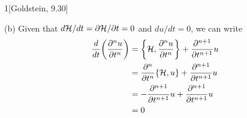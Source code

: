 \documentclass[12pt]{article}
\begin{document}
\begin{problem}{1}[Goldstein, 9.30]
\begin{solution}
(b) Given that $d\mathcal{H}/dt=\partial\mathcal{H}/\partial t=0$ and $du/dt=0$, we can
write
\begin{align}
    \frac{d}{dt}\qty(\frac{\partial^nu}{\partial t^n})
    &=\qty{\mathcal{H},\frac{\partial^nu}{\partial t^n}}+\frac{\partial^{n+1}}{\partial
    t^{n+1}}u\notag\\
    &=\frac{\partial^n}{\partial t^n}\qty{\mathcal{H},u}+\frac{\partial^{n+1}}{\partial
    t^{n+1}}u\notag\\
    &=-\frac{\partial^{n+1}}{\partial t^{n+1}}u+\frac{\partial^{n+1}}{\partial
    t^{n+1}}u\notag\\
    &=0
\end{align}
\end{solution}
\end{problem}
\end{document}
